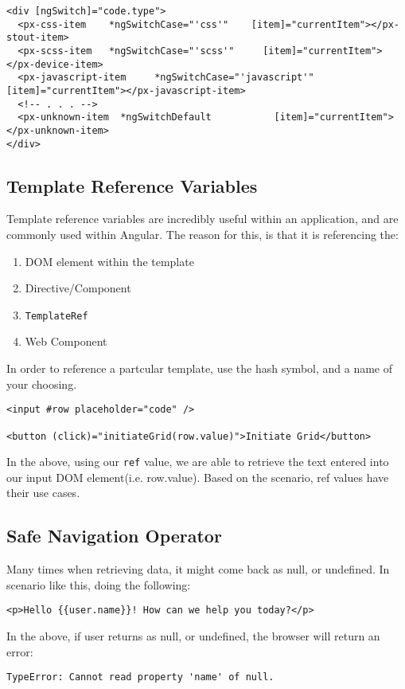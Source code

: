 \begin{lstlisting}
<div [ngSwitch]="code.type">
  <px-css-item    *ngSwitchCase="'css'"    [item]="currentItem"></px-stout-item>
  <px-scss-item   *ngSwitchCase="'scss'"     [item]="currentItem"></px-device-item>
  <px-javascript-item     *ngSwitchCase="'javascript'"  [item]="currentItem"></px-javascript-item>
  <!-- . . . -->
  <px-unknown-item  *ngSwitchDefault           [item]="currentItem"></px-unknown-item>
</div>
\end{lstlisting}

\subsection{ Template Reference Variables }
Template reference variables are incredibly useful within an application, and 
are commonly used within Angular. The reason for this, is that it is 
referencing the:
\begin{enumerate}
  \item DOM element within the template
  \item Directive/Component
  \item \lstinline{TemplateRef}
  \item Web Component
\end{enumerate}

In order to reference a partcular template, use the hash symbol, and a name of 
your choosing. 

\begin{lstlisting}
<input #row placeholder="code" />  

<button (click)="initiateGrid(row.value)">Initiate Grid</button>
\end{lstlisting}

In the above, using our \lstinline{ref} value, we are able to retrieve the 
text entered into our input DOM element(i.e. row.value). Based on the scenario, 
ref values have their use cases. 

\subsection{ Safe Navigation Operator }
Many times when retrieving data, it might come back as null, or undefined. In
scenario like this, doing the following: 
\begin{lstlisting}
<p>Hello {{user.name}}! How can we help you today?</p>  
\end{lstlisting}

In the above, if user returns as null, or undefined, the browser will return 
an error: 
\begin{lstlisting}
TypeError: Cannot read property 'name' of null.  
\end{lstlisting}

